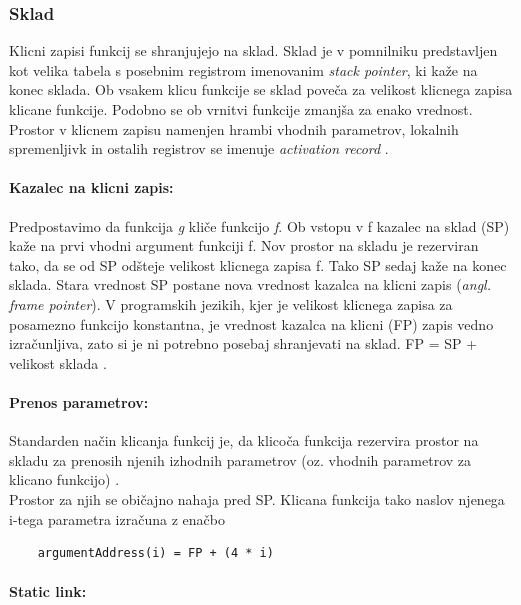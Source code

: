 \documentclass[a4paper, 12p]{book}
\begin{document}
\subsubsection{Sklad}

Klicni zapisi funkcij se shranjujejo na sklad. Sklad je v pomnilniku predstavljen kot velika tabela s posebnim registrom imenovanim \textit{stack pointer}, ki kaže na konec sklada. Ob vsakem klicu funkcije se sklad poveča za velikost klicnega zapisa klicane funkcije. Podobno se ob vrnitvi funkcije zmanjša za enako vrednost. Prostor v klicnem zapisu namenjen hrambi vhodnih parametrov, lokalnih spremenljivk in ostalih registrov se imenuje \textit{activation record} \cite{modernCompiler}. 

\paragraph{Kazalec na klicni zapis:}

Predpostavimo da funkcija \textit{g} kliče funkcijo \textit{f}. Ob vstopu v f kazalec na sklad (SP) kaže na prvi vhodni argument funkciji f. Nov prostor na skladu je rezerviran tako, da se od SP odšteje velikost klicnega zapisa f. Tako SP sedaj kaže na konec sklada. Stara vrednost SP postane nova vrednost kazalca na klicni zapis (\textit{angl. frame pointer}). V programskih jezikih, kjer je velikost klicnega zapisa za posamezno funkcijo konstantna, je vrednost kazalca na klicni (FP) zapis vedno izračunljiva, zato si je ni potrebno posebaj shranjevati na sklad. FP = SP + velikost sklada \cite{modernCompiler}.

\paragraph{Prenos parametrov:}

Standarden način klicanja funkcij je, da klicoča funkcija rezervira prostor na skladu za prenosih njenih izhodnih parametrov (oz. vhodnih parametrov za klicano funkcijo) \cite{modernCompiler}. \\ 
\indent Prostor za njih se običajno nahaja pred SP. Klicana funkcija tako naslov njenega i-tega parametra izračuna z enačbo 
\begin{lstlisting}
	argumentAddress(i) = FP + (4 * i)
\end{lstlisting}

\paragraph{Static link:}
\end{document}
